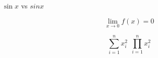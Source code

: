 \documentclass{sample}
\begin{document}
$\sin x$ vs $sin x$

\[
    \lim_{x \to 0} f(x) = 0
\]

\[
    \sum_{i=1}^n x_i^2\ \ 
    \prod_{i=1}^n x_i^2
\]
\end{document}
